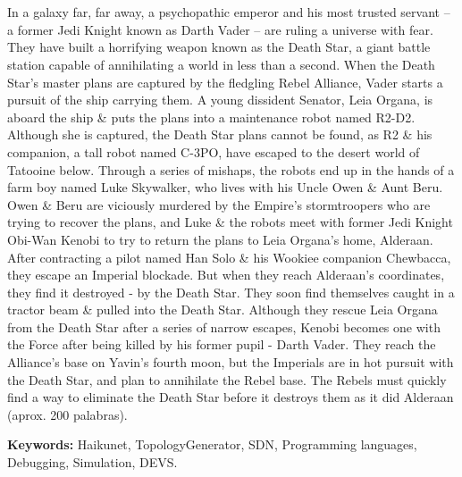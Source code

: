 \chapter*{\runtitle}

\noindent In a galaxy far, far away, a psychopathic emperor and his most trusted servant -- a former Jedi Knight known as Darth Vader -- are ruling a universe with fear. They have built a horrifying weapon known as the Death Star, a giant battle station capable of annihilating a world in less than a second. When the Death Star's master plans are captured by the fledgling Rebel Alliance, Vader starts a pursuit of the ship carrying them. A young dissident Senator, Leia Organa, is aboard the ship \& puts the plans into a maintenance robot named R2-D2. Although she is captured, the Death Star plans cannot be found, as R2 \& his companion, a tall robot named C-3PO, have escaped to the desert world of Tatooine below. Through a series of mishaps, the robots end up in the hands of a farm boy named Luke Skywalker, who lives with his Uncle Owen \& Aunt Beru. Owen \& Beru are viciously murdered by the Empire's stormtroopers who are trying to recover the plans, and Luke \& the robots meet with former Jedi Knight Obi-Wan Kenobi to try to return the plans to Leia Organa's home, Alderaan. After contracting a pilot named Han Solo \& his Wookiee companion Chewbacca, they escape an Imperial blockade. But when they reach Alderaan's coordinates, they find it destroyed - by the Death Star. They soon find themselves caught in a tractor beam \& pulled into the Death Star. Although they rescue Leia Organa from the Death Star after a series of narrow escapes, Kenobi becomes one with the Force after being killed by his former pupil - Darth Vader. They reach the Alliance's base on Yavin's fourth moon, but the Imperials are in hot pursuit with the Death Star, and plan to annihilate the Rebel base. The Rebels must quickly find a way to eliminate the Death Star before it destroys them as it did Alderaan (aprox. 200 palabras).

\bigskip

\noindent\textbf{Keywords:} Haikunet, TopologyGenerator, SDN, Programming languages, Debugging, Simulation, DEVS.